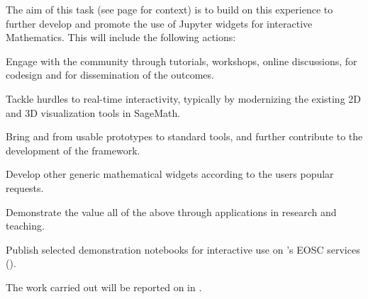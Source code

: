 \begin{task}[
  title=Demonstrator: Interactive Mathematics with Jupyter Widgets,
  id=math,
  lead=UPSUD,
  PM=15, %
  wphases={0-36},
  partners={EGI,EP,QS}
  ]

  The aim of this task (see page
  \pageref{sec:concept-demonstrator-math} for context)
  is to build on this experience to further
  develop and promote the use of Jupyter widgets for interactive
  Mathematics. This will include the following actions:
  \begin{compactitem}
  \item Engage with the community through tutorials, workshops, online
    discussions, for codesign and for dissemination of the outcomes.
  \item Tackle hurdles to real-time interactivity, typically by
    modernizing the existing 2D and 3D visualization tools in
    SageMath. %
  \item Bring  and
     from usable prototypes to standard tools,
    and further contribute to the development of the 
    framework.
  \item Develop other generic mathematical widgets according to the
    users popular requests.
  \item Demonstrate the value all of the above through applications in
    research and teaching.
  \item Publish selected demonstration notebooks for interactive use on
    \TheProject's EOSC services ().
  \end{compactitem}
  The work carried out will be reported on in
  .
\end{task}
